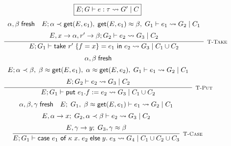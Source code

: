 \begin{figure}
    \centering
    \[
        \fbox{$E; G \vdash e : \tau \rightsquigarrow G'\; |\; C$}
    \]
    \[
        \infer[\textsc{\footnotesize T-Take}]{
            E; G_1
                \vdash \textsf{take } r'\; \{ f = x \} = e_1 \textsf{ in } e_2
                \rightsquigarrow G_3\; |\; C_1 \cup C_2
        }{
            \begin{array}{c}
            \alpha, \beta\; \textsf{fresh}
            \hspace{1em}
            E; \alpha \tlt \textsf{get}(E,e_1),\; \textsf{get}(E,e_1) \teq \beta,\; G_1 \vdash e_1
                \rightsquigarrow G_2\; |\; C_1 \\[5pt]
            E, x \rightarrow \alpha , r' \rightarrow \beta ; G_2 \vdash e_2 \rightsquigarrow G_3\; |\; C_2
            \end{array}
        }
    \]
    \vspace{0.5pt}
    \[
        \infer[\textsc{\footnotesize T-Put}]{
            E; G_1 \vdash \textsf{put } e_1.f := e_2
                \rightsquigarrow G_3\; |\; C_1 \cup C_2
        }{
            \begin{array}{c}
                \alpha, \beta\; \textsf{fresh} \\[5pt]
                E; \alpha \tlt \beta,\; \beta \teq \textsf{get}(E,e_1),\; \alpha \teq \textsf{get}(E,e_2),\; 
                    G_1 \vdash e_1 \rightsquigarrow G_2\; |\; C_1 \\[5pt]
                E; G_2 \vdash e_2 \rightsquigarrow G_3\; |\; C_2
            \end{array}
        }
    \]
    \vspace{0.5pt}
    \[
        \infer[\textsc{\footnotesize T-Case}]{
            E; G_1 \vdash \textsf{case } e_1 \textsf{ of } \kappa\; x.\; e_2\; 
                \textsf{else}\; y.\; e_3
                \rightsquigarrow G_4\; |\; C_1 \cup C_2 \cup C_3
        }{
            \begin{array}{c}
                \alpha, \beta, \gamma\; \textsf{fresh}
                \hspace{1em}
                E;\; G_1,\; \beta \teq \textsf{get}(E, e_1)  \vdash e_1 
                    \rightsquigarrow G_2\; |\; C_1 \\[5pt]
                E, \alpha \rightarrow x ;\; G_2, \alpha \tlt \beta 
                    \vdash e_2 \rightsquigarrow G_3\; |\; C_2 \\[5pt]
                E, \gamma \rightarrow y;\; G_3, \gamma \teq \beta 

\end{array}}\]
\end{figure}
